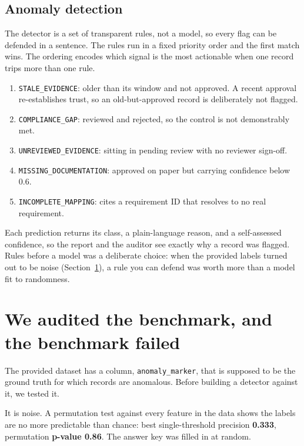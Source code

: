\documentclass[11pt]{article}
\newcommand{\code}[1]{\texttt{\small #1}}
\begin{document}
\subsection{Anomaly detection}\label{sec:detect}

The detector is a set of transparent rules, not a model, so every flag can be defended in a
sentence. The rules run in a fixed priority order and the first match wins. The ordering
encodes which signal is the most actionable when one record trips more than one rule.

\begin{enumerate}[leftmargin=1.4em,itemsep=2pt]
\item \code{STALE\_EVIDENCE}: older than its window and not approved. A recent approval
  re-establishes trust, so an old-but-approved record is deliberately not flagged.
\item \code{COMPLIANCE\_GAP}: reviewed and rejected, so the control is not demonstrably met.
\item \code{UNREVIEWED\_EVIDENCE}: sitting in pending review with no reviewer sign-off.
\item \code{MISSING\_DOCUMENTATION}: approved on paper but carrying confidence below 0.6.
\item \code{INCOMPLETE\_MAPPING}: cites a requirement ID that resolves to no real requirement.
\end{enumerate}

Each prediction returns its class, a plain-language reason, and a self-assessed confidence,
so the report and the auditor see exactly why a record was flagged. Rules before a model was
a deliberate choice: when the provided labels turned out to be noise
(Section~\ref{sec:finding}), a rule you can defend was worth more than a model fit to
randomness.

\section{We audited the benchmark, and the benchmark failed}\label{sec:finding}

The provided dataset has a column, \code{anomaly\_marker}, that is supposed to be the
ground truth for which records are anomalous. Before building a detector against it, we
tested it.

\begin{findingbox}
\sffamily\small
It is noise. A permutation test against every feature in the data shows the labels are no
more predictable than chance: best single-threshold precision \textbf{0.333}, permutation
\textbf{p-value 0.86}. The answer key was filled in at random.
\end{findingbox}
\end{document}
